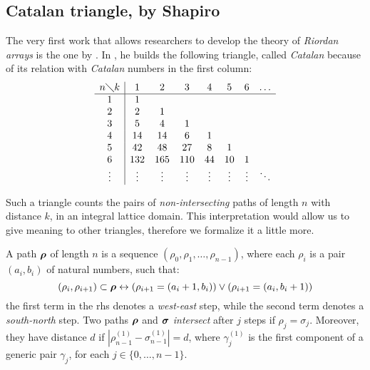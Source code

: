 
\subsection{Catalan triangle, by Shapiro}

The very first work that allows researchers to develop the theory of
\emph{Riordan arrays} is the one by \citeauthor{shapiro:1976}. 
In \cite{shapiro:1976}, he builds the following triangle, called
\emph{Catalan} because of its relation with \emph{Catalan} numbers in the first
column:
\begin{equation}
    \begin{array}{c|ccccccc}
        n\diagdown k & 1 & 2 & 3 & 4 & 5 & 6&\ldots\\
        \hline
        1&1 & & & & & &\\
        2&2 &1 & & & & &\\
        3&5 &4 &1 & & & &\\
        4&14 &14 &6 &1 & & &\\
        5&42 &48 &27 &8 &1 & &\\
        6&132 &165 &110 &44 &10 &1& \\
        \vdots&\vdots&\vdots&\vdots&\vdots&\vdots&\vdots&\ddots \\
    \end{array}
    \label{eq:shapiro:catalan:triangle:expanded}
\end{equation}

Such a triangle counts the pairs of \emph{non-intersecting} paths of length $n$
with distance $k$, in an integral lattice domain. This interpretation would
allow us to give meaning to other triangles, 
therefore we formalize it a little more.

A path $\boldsymbol{\rho}$ of length $n$ is a sequence $(\rho_{0},\rho_{1},\ldots,\rho_{n-1})$,
where each $\rho_{i}$ is a pair $(a_{i},b_{i})$ of natural numbers, such that:
\begin{displaymath}
    (\rho_{i},\rho_{i+1})\subset\boldsymbol{\rho} \leftrightarrow
    (\rho_{i+1}=(a_{i}+1,b_{i})) \vee 
    (\rho_{i+1}=(a_{i},b_{i}+1)) 
\end{displaymath}
the first term in the \ac{rhs} denotes a \emph{west-east} step, while the second
term denotes a \emph{south-north} step. Two paths $\boldsymbol{\rho}$ and $\boldsymbol{\sigma}$
\emph{intersect} after $j$ steps if $\rho_{j}=\sigma_{j}$. Moreover, they have distance
$d$ if $\left|\rho_{n-1}^{(1)}-\sigma_{n-1}^{(1)}\right|=d$, where $\gamma_{j}^{(1)}$ is
the first component of a generic pair $\gamma_{j}$, for each $j\in\lbrace0,\ldots,n-1\rbrace$.

